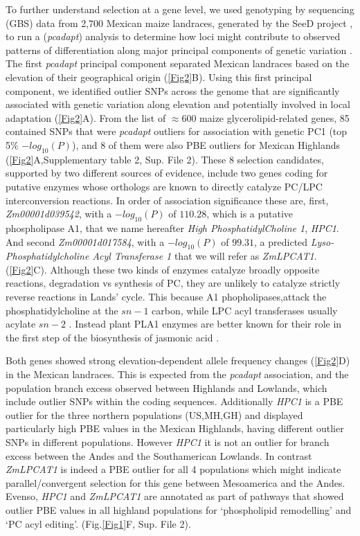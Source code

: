 \documentclass[9pt,twocolumn,twoside,lineno]{biorxiv}
\newcommand{\hpc}{\textit{HPC1}\xspace}
\begin{document}
To further understand selection at a gene level, we used genotyping by sequencing (GBS) data from 2,700 Mexican maize landraces, generated by the SeeD project \cite{Romero_Navarro2017-cn, Gates2019-xu}, to run a (\textit{pcadapt}) analysis to determine how loci might contribute to observed patterns of differentiation along major principal components of genetic variation \cite{Luu2017-ws}.
The first \textit{pcadapt} principal component separated Mexican landraces based on the elevation of their geographical origin (\cref{Fig2}B).
Using this first principal component, we identified outlier SNPs across the genome that are significantly associated with genetic variation along elevation and potentially involved in local adaptation (\cref{Fig2}A).
From the list of $\approx 600$ maize glycerolipid-related genes, 85 contained SNPs that were \textit{pcadapt} outliers for association with genetic PC1 (top 5\% $-log_{10}(P)$), and 8 of them were also PBE outliers for Mexican Highlands (\cref{Fig2}A,Supplementary table 2, Sup. File 2). 
These 8 selection candidates, supported by two different sources of evidence, include two genes coding for putative enzymes whose orthologs are known to directly catalyze PC/LPC interconversion reactions. 
In order of association significance these are, first, \textit{Zm00001d039542}, with a $-log_{10}(P)$ of $110.28$, which is  a putative phospholipase A1, that we name hereafter \textit{High PhosphatidylCholine 1}, \hpc.
And second \textit{Zm00001d017584}, with a $-log_{10}(P)$ of $99.31$,  a predicted \textit{Lyso-Phosphatidylcholine Acyl Transferase 1} that we will refer as \textit{ZmLPCAT1}. (\cref{Fig2}C). 
Although these two kinds of enzymes catalyze broadly opposite reactions, degradation vs synthesis of PC, they are unlikely to catalyze strictly reverse reactions in Lands' cycle. 
This because A1 phopholipases,attack the phosphatidylcholine at the $sn-1$ carbon, while LPC acyl transferases usually acylate $sn-2$ \cite{wang2012,richmond2011}.
Instead plant PLA1 enzymes are better known for their role in the first step of the biosynthesis of jasmonic acid \cite{wang2018b, Ishiguro2001-ob}.

Both genes showed strong elevation-dependent allele frequency changes (\cref{Fig2}D) in the Mexican landraces. This is expected from the \textit{pcadapt} association, and the population branch excess observed between Highlands and Lowlands, which include outlier SNPs within the coding sequences. 
Additionally \hpc is a PBE outlier for the three northern populations (US,MH,GH) and displayed particularly high PBE values in the Mexican Highlands, having different outlier SNPs in different populations. 
However \hpc it is not an outlier for branch excess between the Andes and the Southamerican Lowlands.
In contrast \textit{ZmLPCAT1} is indeed a PBE outlier for all 4 populations which might indicate  parallel/convergent selection for this gene between Mesoamerica and the Andes.
Evenso, \hpc and \textit{ZmLPCAT1} are annotated as part of pathways that showed outlier PBE values in all highland populations for ‘phospholipid remodelling’ and ‘PC acyl editing’. (Fig.\cref{Fig1}F, Sup. File 2). 
\end{document}
